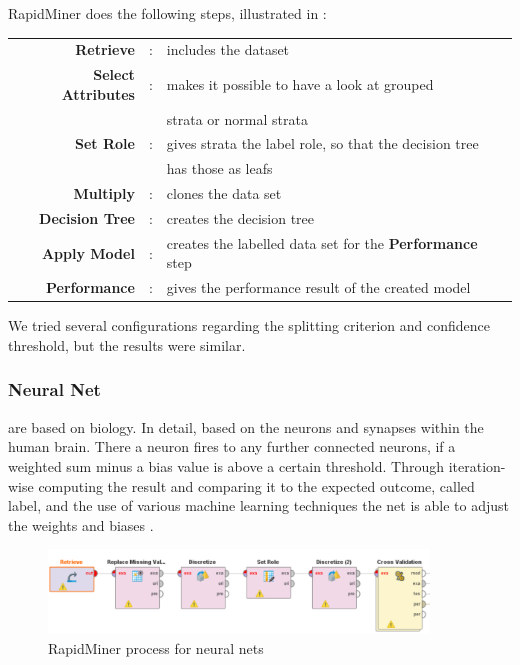	RapidMiner does the following steps, illustrated in :
	
	\begin{tabular}{r c l}
		\textbf{Retrieve} & : & includes the dataset\\
		\textbf{Select Attributes} & : & makes it possible to have a look at grouped\\
		&& strata or normal strata\\
		\textbf{Set Role} & : & gives strata the label role, so that the decision tree\\
		&& has those as leafs\\
		\textbf{Multiply} & : & clones the data set \\
		\textbf{Decision Tree} &: & creates the decision tree\\
		\textbf{Apply Model} & : & creates the labelled data set for the \textbf{Performance} step\\
		\textbf{Performance} & : & gives the performance result of the created model\\
	\end{tabular}
	
	We tried several configurations regarding the splitting criterion and  confidence threshold, but the results were similar.
	\vspace*{-1em}

	\subsubsection{Neural Net}
	are based on biology. In detail, based on the neurons and synapses within the human brain. There a neuron fires to any further connected neurons, if a weighted sum minus a bias value is above a certain threshold.
	Through iteration-wise computing the result and comparing it to the expected outcome, called label, and the use of various machine learning techniques the net is able to adjust the weights and biases \cite{neuralNet}.
	
	\vspace*{-2em}
	\begin{figure}[H]
		\centering
		\includegraphics[width = 0.9\textwidth]{RapidNN.PNG}
		\caption{RapidMiner process for neural nets}
		\vspace*{-1em}
	\end{figure}
	
